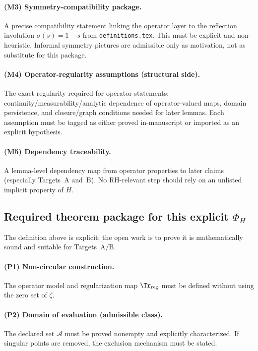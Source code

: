\paragraph{(M3) Symmetry-compatibility package.}
A precise compatibility statement linking the operator layer to the reflection involution $\sigma(s)=1-s$ from \texttt{definitions.tex}.
This must be explicit and non-heuristic.
Informal symmetry pictures are admissible only as motivation, not as substitute for this package.

\paragraph{(M4) Operator-regularity assumptions (structural side).}
The exact regularity required for operator statements: continuity/measurability/analytic dependence of operator-valued maps, domain persistence, and closure/graph conditions needed for later lemmas.
Each assumption must be tagged as either proved in-manuscript or imported as an explicit hypothesis.

\paragraph{(M5) Dependency traceability.}
A lemma-level dependency map from operator properties to later claims (especially Targets~A and~B).
No RH-relevant step should rely on an unlisted implicit property of $H$.

\subsection*{Required theorem package for this explicit \texorpdfstring{$\Phi_H$}{Phi_H}}
The definition above is explicit; the open work is to prove it is mathematically sound and suitable for Targets~A/B.

\paragraph{(P1) Non-circular construction.}
The operator model and regularization map $\Tr_{\mathrm{reg}}$ must be defined without using the zero set of $\zeta$.

\paragraph{(P2) Domain of evaluation (admissible class).}
The declared set $\mathcal{A}$ must be proved nonempty and explicitly characterized.
If singular points are removed, the exclusion mechanism must be stated.


